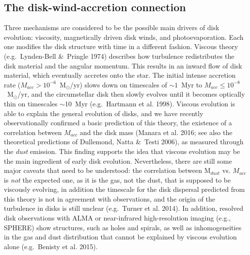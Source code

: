\documentclass[10pt,fleqn,twoside]{article}
\begin{document}
\subsection{The disk-wind-accretion connection}

Three mechanisms are considered to be the possible main drivers of disk evolution: viscosity,
magnetically driven disk winds, and photoevaporation. Each one modifies the disk structure with 
time in a different fashion. Viscous theory (e.g.\ Lynden-Bell \&\ Pringle 1974) describes how
turbulence redistributes the disk material and the angular momentum. This results in an inward 
flow of disk material, which eventually accretes onto the star. The initial intense accretion 
rate ($M_{acc}>10^{-6}$~M$_\odot$/yr)
slows down on timescales of $\sim 1$~Myr to $M_{acc}\le 10^{-8}$~M$_\odot$/yr,
and the circumstellar disk then slowly evolves until it 
becomes optically thin on timescales $\sim$10~Myr (e.g.\ Hartmann et al. 1998). Viscous 
evolution is able to explain the general evolution of disks, and we have recently observationally confirmed a basic prediction of this theory, the existence of a correlation between $M_{acc}$ 
and the disk mass (Manara et al. 2016; see also the theoretical predictions of 
Dullemond, Natta \&\ Testi 2006), as measured through the {\it dust} emission. This 
finding supports the idea that viscous evolution may be the main ingredient of early disk evolution.
Nevertheless, there are still some major caveats that need to be understood:
the correlation between  M$_{dust}$ vs. $M_{acc}$ is {\it not} the expected one, as it is the gas,
not the dust, that is supposed to be viscously evolving, in addition
the timescale for the disk dispersal predicted from this theory is not in agreement with 
observations, and the origin of the turbulence in disks is still unclear 
(e.g.\ Turner et al. 2014). In addition, resolved disk observations with ALMA or 
near-infrared high-resolution imaging (e.g., SPHERE) show structures, such as holes and 
spirals, as well as inhomogeneities in the gas and dust distribution that cannot be 
explained by viscous evolution alone (e.g.\ Benisty et al. 2015). 
\end{document}
